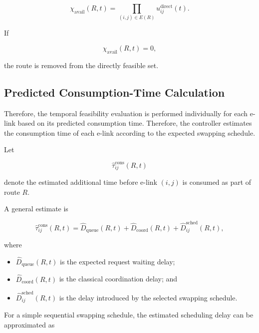 \begin{equation}
    \chi_{\mathrm{avail}}(R,t)
    =
    \prod_{
    (i,j)
    \in
    E(R)
    }
    u_{ij}^{\mathrm{direct}}(t).
\end{equation}

If

\begin{equation}
    \chi_{\mathrm{avail}}(R,t)
    =
    0,
\end{equation}

the route is removed from the directly feasible set.

\subsection{Predicted Consumption-Time Calculation}

Therefore, the temporal feasibility evaluation is performed individually for each e-link based on its predicted consumption time. Therefore, the controller estimates the consumption time of each e-link according to the expected swapping schedule.

Let

\begin{equation}
    \widehat{\tau}_{ij}^{\mathrm{cons}}(R,t)
\end{equation}

denote the estimated additional time before e-link $(i,j)$ is consumed as part of route $R$.

A general estimate is

\begin{equation}
    \widehat{\tau}_{ij}^{\mathrm{cons}}(R,t)
    =
    \widehat{D}_{\mathrm{queue}}(R,t)
    +
    \widehat{D}_{\mathrm{coord}}(R,t)
    +
    \widehat{D}_{ij}^{\mathrm{sched}}(R,t),
\end{equation}

where

\begin{itemize}
    \item $\widehat{D}_{\mathrm{queue}}(R,t)$ is the expected request waiting delay;
    \item $\widehat{D}_{\mathrm{coord}}(R,t)$ is the classical coordination delay; and
    \item $\widehat{D}_{ij}^{\mathrm{sched}}(R,t)$ is the delay introduced by the selected swapping schedule.
\end{itemize}

For a simple sequential swapping schedule, the estimated scheduling delay can be approximated as

